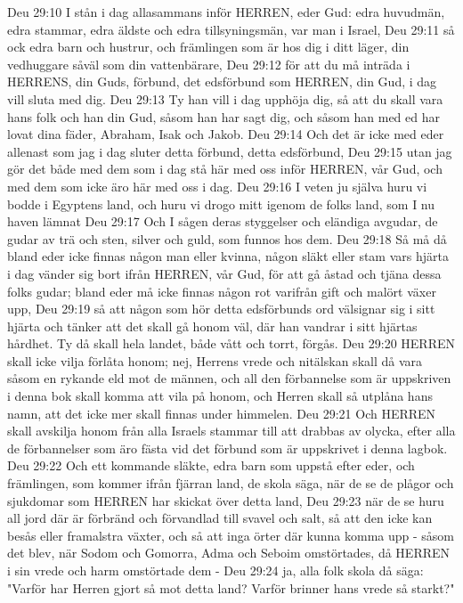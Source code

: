Deu 29:10  I stån i dag allasammans inför HERREN, eder Gud: edra huvudmän, edra stammar, edra äldste och edra tillsyningsmän, var man i Israel,
Deu 29:11  så ock edra barn och hustrur, och främlingen som är hos dig i ditt läger, din vedhuggare såväl som din vattenbärare,
Deu 29:12  för att du må inträda i HERRENS, din Guds, förbund, det edsförbund som HERREN, din Gud, i dag vill sluta med dig.
Deu 29:13  Ty han vill i dag upphöja dig, så att du skall vara hans folk och han din Gud, såsom han har sagt dig, och såsom han med ed har lovat dina fäder, Abraham, Isak och Jakob.
Deu 29:14  Och det är icke med eder allenast som jag i dag sluter detta förbund, detta edsförbund,
Deu 29:15  utan jag gör det både med dem som i dag stå här med oss inför HERREN, vår Gud, och med dem som icke äro här med oss i dag.
Deu 29:16  I veten ju själva huru vi bodde i Egyptens land, och huru vi drogo mitt igenom de folks land, som I nu haven lämnat
Deu 29:17  Och I sågen deras styggelser och eländiga avgudar, de gudar av trä och sten, silver och guld, som funnos hos dem.
Deu 29:18  Så må då bland eder icke finnas någon man eller kvinna, någon släkt eller stam vars hjärta i dag vänder sig bort ifrån HERREN, vår Gud, för att gå åstad och tjäna dessa folks gudar; bland eder må icke finnas någon rot varifrån gift och malört växer upp,
Deu 29:19  så att någon som hör detta edsförbunds ord välsignar sig i sitt hjärta och tänker att det skall gå honom väl, där han vandrar i sitt hjärtas hårdhet. Ty då skall hela landet, både vått och torrt, förgås.
Deu 29:20  HERREN skall icke vilja förlåta honom; nej, Herrens vrede och nitälskan skall då vara såsom en rykande eld mot de männen, och all den förbannelse som är uppskriven i denna bok skall komma att vila på honom, och Herren skall så utplåna hans namn, att det icke mer skall finnas under himmelen.
Deu 29:21  Och HERREN skall avskilja honom från alla Israels stammar till att drabbas av olycka, efter alla de förbannelser som äro fästa vid det förbund som är uppskrivet i denna lagbok.
Deu 29:22  Och ett kommande släkte, edra barn som uppstå efter eder, och främlingen, som kommer ifrån fjärran land, de skola säga, när de se de plågor och sjukdomar som HERREN har skickat över detta land,
Deu 29:23  när de se huru all jord där är förbränd och förvandlad till svavel och salt, så att den icke kan besås eller framalstra växter, och så att inga örter där kunna komma upp - såsom det blev, när Sodom och Gomorra, Adma och Seboim omstörtades, då HERREN i sin vrede och harm omstörtade dem -
Deu 29:24  ja, alla folk skola då säga: "Varför har Herren gjort så mot detta land? Varför brinner hans vrede så starkt?"
